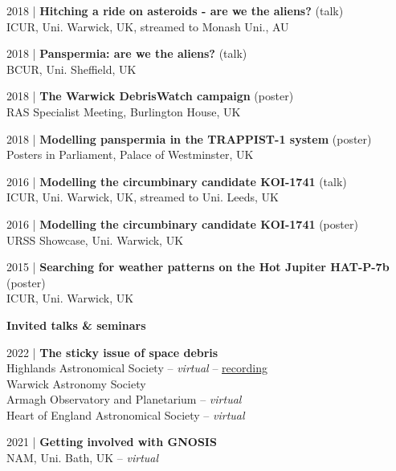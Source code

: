 \documentclass[10pt,a4paper]{altacv}
\begin{document}
\small 2018 | \textbf{Hitching a ride on asteroids - are we the aliens?} (talk) \\
ICUR, Uni. Warwick, UK, streamed to Monash Uni., AU

\smallskip

\small 2018 | \textbf{Panspermia: are we the aliens?} (talk) \\
BCUR, Uni. Sheffield, UK

\smallskip

\small 2018 | \textbf{The Warwick DebrisWatch campaign} (poster) \\
RAS Specialist Meeting, Burlington House, UK

\smallskip

\small 2018 | \textbf{Modelling panspermia in the TRAPPIST-1 system} (poster) \\
Posters in Parliament, Palace of Westminster, UK

\smallskip

\small 2016 | \textbf{Modelling the circumbinary candidate KOI-1741} (talk) \\
ICUR, Uni. Warwick, UK, streamed to Uni. Leeds, UK

\smallskip

\small 2016 | \textbf{Modelling the circumbinary candidate KOI-1741} (poster) \\
URSS Showcase, Uni. Warwick, UK

\smallskip

\small 2015 | \textbf{Searching for weather patterns on the Hot Jupiter HAT-P-7b} (poster) \\
ICUR, Uni. Warwick, UK

\divider

\normalsize \textbf{Invited talks \& seminars}

\medskip

\small 2022 | \textbf{The sticky issue of space debris} \\
Highlands Astronomical Society -- \textit{virtual} -- \href{https://youtu.be/WMC-LWQ0q7o}{recording} \\
Warwick Astronomy Society \\
Armagh Observatory and Planetarium -- \textit{virtual} \\
Heart of England Astronomical Society -- \textit{virtual}

\smallskip

\small 2021 | \textbf{Getting involved with GNOSIS} \\
NAM, Uni. Bath, UK -- \textit{virtual}
\end{document}
